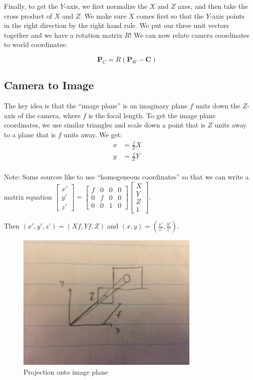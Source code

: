 \documentclass{article}
\begin{document}
Finally, to get the $Y$-axis, we first normalize the $X$ and $Z$ axes, and then take the cross product of $X$ and $Z$. 
We make sure $X$ comes first so that the $Y$-axis points in the right direction by the right hand rule. 
We put our three unit vectors together and we have a rotation matrix $R$! 
We can now relate camera coordinates to world coordinates:

\[ \bm{P}_{C}=R(\bm{P}_{W}-\bm{C}) \]

\subsection{Camera to Image}
The key idea is that the ``image plane'' is an imaginary plane $f$ units down the $Z$-axis of the camera, where $f$ is the focal length. 
To get the image plane coordinates, we use similar triangles and scale down a point that is $Z$ units away to a plane that is $f$ units away. We get:
\begin{align*}
x&=\frac{f}{Z}X \\
y&=\frac{f}{Z}Y \\
\end{align*}

Note: Some sources like to use ``homogeneous coordinates'' so that we can write a matrix equation
 $\begin{bmatrix} x' \\ y' \\ z' \end{bmatrix}=\begin{bmatrix} f & 0 & 0 & 0 \\ 0 & f & 0 & 0 \\ 0 & 0 & 1 & 0 \end{bmatrix}\begin{bmatrix} X \\ Y \\ Z \\ 1 \end{bmatrix}$. 
 
 Then $(x', y', z')=(Xf, Yf, Z)$ and $(x, y)=(\frac{x'}{z'}, \frac{y'}{z'})$. 

\begin{figure}[H]
\includegraphics[width=0.8\textwidth]{Image_Plane}
\centering
\caption*{Projection onto image plane}
\end{figure}
\end{document}
